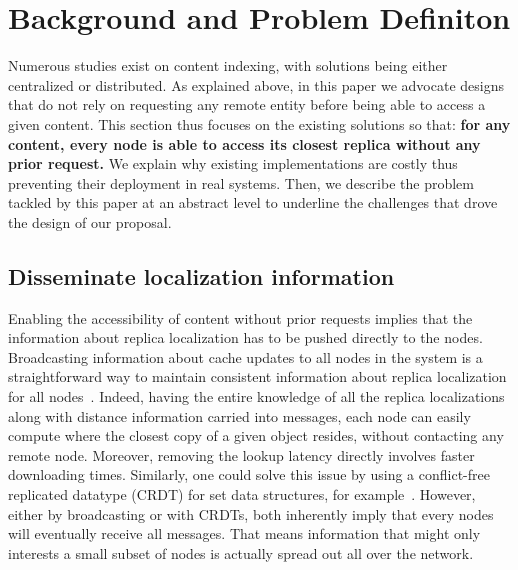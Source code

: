 \section{Background and Problem Definiton}
\label{sec:background}

Numerous studies exist on content indexing, with solutions being either centralized or distributed. As explained above, in this paper we advocate designs that do not rely on requesting any remote entity before being able to access a given content.
This section thus focuses on the existing solutions so that: \textbf{for any content, every node is able to access its closest replica without any prior request.}
We explain why existing implementations are costly thus preventing their deployment in real systems.
Then, we describe the problem tackled by this paper at an abstract level to underline the challenges that drove the design of our proposal. 


\subsection*{Disseminate localization information}
Enabling the accessibility of content without prior requests implies that the information about replica localization has to be pushed directly to the nodes.
Broadcasting information about cache updates to all nodes in the system is a straightforward way to maintain consistent information about replica localization for all nodes~\cite{nlsr,lscr}. Indeed, having the entire knowledge of all the replica localizations along with distance information carried into messages, each node can easily compute where the closest copy of a given object resides, without contacting any remote node. Moreover, removing the lookup latency directly involves faster downloading times. 
Similarly, one could solve this issue by using a conflict-free replicated datatype (CRDT) for set data structures, for example~\cite{shapiro2011crdts}. 
However, either by broadcasting or with CRDTs, both inherently imply that every nodes will eventually receive all messages. 
That means information that might only interests a small subset of nodes is actually spread out all over the network. 


